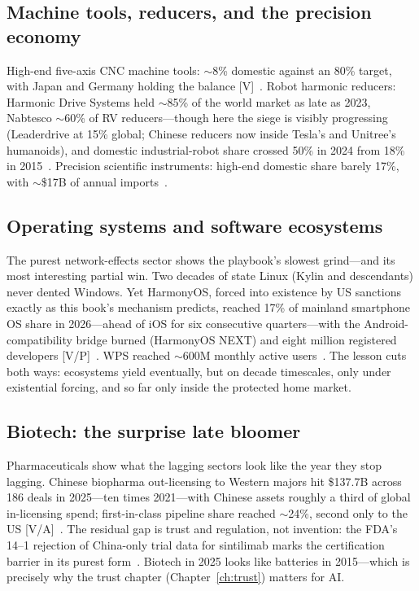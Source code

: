 \subsection{Machine tools, reducers, and the precision economy}

High-end five-axis CNC machine tools: $\sim$8\% domestic against an 80\% target, with Japan and Germany holding the balance [V]~\cite{machine-tools}. Robot harmonic reducers: Harmonic Drive Systems held $\sim$85\% of the world market as late as 2023, Nabtesco $\sim$60\% of RV reducers---though here the siege is visibly progressing (Leaderdrive at 15\% global; Chinese reducers now inside Tesla's and Unitree's humanoids), and domestic industrial-robot share crossed 50\% in 2024 from 18\% in 2015~\cite{harmonic,machine-tools}. Precision scientific instruments: high-end domestic share barely 17\%, with $\sim$\$17B of annual imports~\cite{instruments}.

\subsection{Operating systems and software ecosystems}

The purest network-effects sector shows the playbook's slowest grind---and its most interesting partial win. Two decades of state Linux (Kylin and descendants) never dented Windows. Yet HarmonyOS, forced into existence by US sanctions exactly as this book's mechanism predicts, reached 17\% of mainland smartphone OS share in 2026---ahead of iOS for six consecutive quarters---with the Android-compatibility bridge burned (HarmonyOS NEXT) and eight million registered developers [V/P]~\cite{harmonyos}. WPS reached $\sim$600M monthly active users~\cite{harmonyos}. The lesson cuts both ways: ecosystems yield eventually, but on decade timescales, only under existential forcing, and so far only inside the protected home market.

\subsection{Biotech: the surprise late bloomer}

Pharmaceuticals show what the lagging sectors look like the year they stop lagging. Chinese biopharma out-licensing to Western majors hit \$137.7B across 186 deals in 2025---ten times 2021---with Chinese assets roughly a third of global in-licensing spend; first-in-class pipeline share reached $\sim$24\%, second only to the US [V/A]~\cite{biotech}. The residual gap is trust and regulation, not invention: the FDA's 14--1 rejection of China-only trial data for sintilimab marks the certification barrier in its purest form~\cite{biotech}. Biotech in 2025 looks like batteries in 2015---which is precisely why the trust chapter (Chapter~\ref{ch:trust}) matters for AI.

